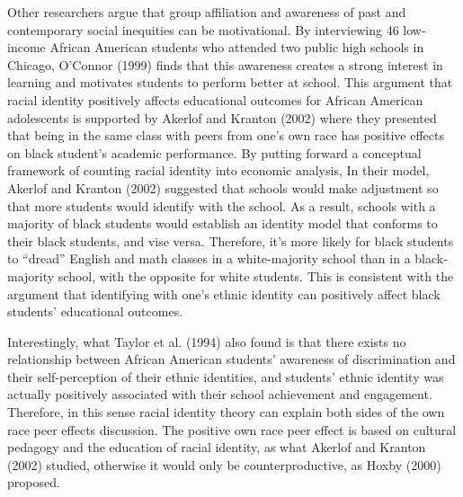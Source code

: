 \noindent Other researchers argue that group affiliation and awareness of past and contemporary social inequities can be motivational. By interviewing 46 low-income African American students who attended two public high schools in Chicago, O’Connor (1999) finds that this awareness creates a strong interest in learning and motivates students to perform better at school. This argument that racial identity positively affects educational outcomes for African American adolescents is supported by Akerlof and Kranton (2002) where they presented that being in the same class with peers from one’s own race has positive effects on black student’s academic performance. By putting forward a conceptual framework of counting racial identity into economic analysis, In their model, Akerlof and Kranton (2002) suggested that schools would make adjustment so that more students would identify with the school. As a result, schools with a majority of black students would establish an identity model that conforms to their black students, and vise versa. Therefore, it’s more likely for black students to “dread” English and math classes in a white-majority school than in a black-majority school, with the opposite for white students. This is consistent with the argument that identifying with one’s ethnic identity can positively affect black students’ educational outcomes.

\noindent Interestingly, what Taylor et al. (1994) also found is that there exists no relationship between African American students’ awareness of discrimination and their self-perception of their ethnic identities, and students’ ethnic identity was actually positively associated with their school achievement and engagement. Therefore, in this sense racial identity theory can explain both sides of the own race peer effects discussion. The positive own race peer effect is based on cultural pedagogy and the education of racial identity, as what Akerlof and Kranton (2002) studied, otherwise it would only be counterproductive, as Hoxby (2000) proposed. 


